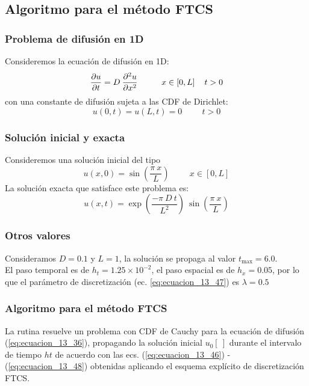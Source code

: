 \subsection{Algoritmo para el método FTCS}
\begin{frame}
\frametitle{Problema de difusión en 1D}
Consideremos la ecuación de difusión en 1D:
\begin{equation}
\dfrac{\partial u}{\partial t} =  D \: \dfrac{\partial^{2} u}{\partial x^{2}} \hspace{1cm} x \in [0, L] \hspace{0.4cm} t > 0
\label{eq:ecuacion_13_51}
\end{equation}
con una constante de difusión sujeta a las CDF de Dirichlet:
\begin{equation}
u(0, t) = u(L, t) = 0 \hspace{1cm} t > 0
\label{eq:ecuacion_13_52}
\end{equation}
\end{frame}
\begin{frame}
\frametitle{Solución inicial y exacta}
Consideremos una solución inicial del tipo
\begin{equation}
u(x, 0) = \sin \left( \dfrac{\pi \: x}{L} \right) \hspace{1cm} x \in [0, L]
\label{eq:ecuacion_13_53}
\end{equation}
\pause
La solución exacta que satisface este problema es:
\begin{equation}
u(x, t) = \exp \left( \dfrac{- \pi \: D \: t}{L^{2}} \right) \: \sin \left( \dfrac{\pi \: x}{L} \right)
\end{equation}
\end{frame}
\begin{frame}
\frametitle{Otros valores}
Consideramos $D=0.1$ y $L=1$, la solución se propaga al valor $t_{\text{max}}=6.0$.
\\
\bigskip
El paso temporal es de $h_{t}=1.25 \times 10^{-2}$, el paso espacial es de $h_{x}=0.05$, por lo que el parámetro de discretización (ec. \ref{eq:ecuacion_13_47}) es $\lambda=0.5$
\end{frame}
\begin{frame}
\frametitle{Algoritmo para el método FTCS}
La rutina  resuelve un problema con CDF de Cauchy para la ecuación de difusión (\ref{eq:ecuacion_13_36}), propagando la solución inicial $u_0[ \ ]$ durante el intervalo de tiempo $ht$ de acuerdo con las ecs. (\ref{eq:ecuacion_13_46}) - (\ref{eq:ecuacion_13_48}) obtenidas aplicando el esquema explícito de discretización FTCS.
\end{frame}
